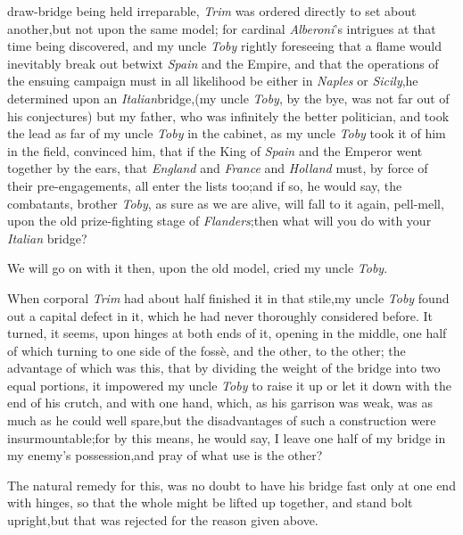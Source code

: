 \documentclass{article}
\begin{document}
 draw-bridge being held
irrepa\-rable, \textit{Trim} was ordered directly to set about
another,\tsh but not upon the same model; for cardinal
\textit{Alberoni}’s intrigues at that time being discovered,
and my uncle \textit{Toby} rightly foreseeing that a flame would
inevitably break out betwixt \textit{Spain} and the Empire, and that
the operations of the ensuing campaign must in all likelihood be
either in \textit{Naples} or \textit{Sicily},\tsh he determined
upon an \textit{Italian}\break bridge,\tsk (my uncle \textit{Toby},
by the bye, was not far out of his conjectures)\tsh\break
but my father, who was infinitely the better politician, and
took the lead as far of my uncle \textit{Toby} in the cabinet,
as my uncle \textit{Toby} took it of him in the field,\tsh
convinced him, that if the King of \textit{Spain} and the
Emperor went together by the ears, that \textit{England} and
\textit{France} and \textit{Holland} must, by force of their
pre-engage\-ments, all enter the lists too;\tsh and if so, he
would say, the combatants, brother \textit{Toby}, as sure as we
are alive, will fall to it again, pell-mell, upon the old
prize-fighting stage of \textit{Flanders};\tsk then what will
you do with your \textit{Italian} bridge?

\tsk We will go on with it then, upon the old model, cried my
uncle \textit{Toby}.

When corporal \textit{Trim} had about half finished it in that
stile,\tsh my uncle \textit{Toby} found out a capital defect in
it, which he had never thoroughly considered before. It turned,
it seems, upon hinges at both ends of it, opening in the middle,
one half of which turning to one side of the fossè, and the
other, to the other; the advantage of which was this, that by
dividing the weight of the bridge into two equal portions, it
impowered my uncle \textit{Toby} to raise it up or let it down
with the end of his crutch, and with one hand, which, as his
garrison was weak, was as much as he could well spare,\tsk but
the disadvantages of such a construction were
insurmountable;\tsh for by this means, he would say, I leave one
half of my bridge in my enemy’s possession,\tsh and pray of what
use is the other?

The natural remedy for this, was no doubt to have his bridge
fast only at one end with hinges, so that the whole might be lifted
up together, and stand bolt upright,\tsh but that was
rejected for the reason given above.
\end{document}
